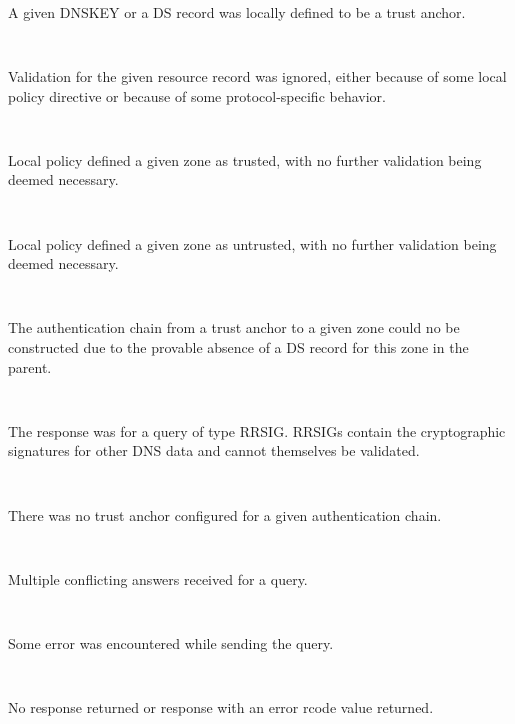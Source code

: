 \begin{description}
\begin{description}
\begin{description}
\item {}\verb" "

A given DNSKEY or a DS record was locally defined to be
a trust anchor.

\item {}\verb" "

Validation for the given resource record was ignored,
either because of some local policy directive or because
of some protocol-specific behavior.

\item {}\verb" "

Local policy defined a given zone as trusted, with no
further validation being deemed necessary.

\item {}\verb" "

Local policy defined a given zone as untrusted, with no
further validation being deemed necessary.

\item {}\verb" "

The authentication chain from a trust anchor to a given
zone could no be constructed due to the provable absence
of a DS record for this zone in the parent.

\item {}\verb" "

The response was for a query of type RRSIG.  RRSIGs
contain the cryptographic signatures for other DNS
data and cannot themselves be validated.

\item {}\verb" "

There was no trust anchor configured for a given
authentication chain.

\item {}\verb" "

Multiple conflicting answers received for a query.

\item {}\verb" "

Some error was encountered while sending the query.

\item {}\verb" "

No response returned or response with an error rcode
value returned.


\end{description}
\end{description}
\end{description}
